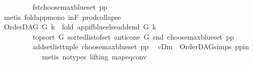 \begin{isabellebody}
\ \ \ \ \ \ \ \ \ {\isacharparenleft}{\kern0pt}fst{\isacharparenleft}{\kern0pt}{\isacharparenleft}{\kern0pt}choose{\isacharunderscore}{\kern0pt}max{\isacharunderscore}{\kern0pt}blue{\isacharunderscore}{\kern0pt}set\ pp{\isacharparenright}{\kern0pt}{\isacharparenright}{\kern0pt}{\isacharparenright}{\kern0pt}{\isacharparenright}{\kern0pt}{\isacharparenright}{\kern0pt}{\isachardoublequoteclose}\isanewline
\ \ \ \ \ \ \ \ \ \ \isamarkupfalse%
\ {\isacharparenleft}{\kern0pt}metis\ fold{\isacharunderscore}{\kern0pt}app{\isacharunderscore}{\kern0pt}mono{}\ in{\isacharunderscore}{\kern0pt}F\ prod{\isachardot}{\kern0pt}collapse{\isacharparenright}{\kern0pt}\ \isanewline
\ \ \ \ \ \ \ \ \isamarkupfalse%
\ \isamarkupfalse%
\ {\isachardoublequoteopen}OrderDAG\ G\ k\ {\isacharequal}{\kern0pt}\ {\isacharparenleft}{\kern0pt}fold\ {\isacharparenleft}{\kern0pt}app{\isacharunderscore}{\kern0pt}if{\isacharunderscore}{\kern0pt}blue{\isacharunderscore}{\kern0pt}else{\isacharunderscore}{\kern0pt}add{\isacharunderscore}{\kern0pt}end\ G\ k{\isacharparenright}{\kern0pt}\isanewline
\ \ \ \ \ \ \ \ \ {\isacharparenleft}{\kern0pt}top{\isacharunderscore}{\kern0pt}sort\ G\ {\isacharparenleft}{\kern0pt}sorted{\isacharunderscore}{\kern0pt}list{\isacharunderscore}{\kern0pt}of{\isacharunderscore}{\kern0pt}set\ {\isacharparenleft}{\kern0pt}anticone\ G\ {\isacharparenleft}{\kern0pt}snd\ {\isacharparenleft}{\kern0pt}choose{\isacharunderscore}{\kern0pt}max{\isacharunderscore}{\kern0pt}blue{\isacharunderscore}{\kern0pt}set\ pp{\isacharparenright}{\kern0pt}{\isacharparenright}{\kern0pt}{\isacharparenright}{\kern0pt}{\isacharparenright}{\kern0pt}{\isacharparenright}{\kern0pt}\isanewline
\ \ \ \ \ \ \ \ \ {\isacharparenleft}{\kern0pt}add{\isacharunderscore}{\kern0pt}set{\isacharunderscore}{\kern0pt}list{\isacharunderscore}{\kern0pt}tuple\ {\isacharparenleft}{\kern0pt}choose{\isacharunderscore}{\kern0pt}max{\isacharunderscore}{\kern0pt}blue{\isacharunderscore}{\kern0pt}set\ pp{\isacharparenright}{\kern0pt}{\isacharparenright}{\kern0pt}{\isacharparenright}{\kern0pt}{\isachardoublequoteclose}\ \isamarkupfalse%
\ cDm\ {}\ OrderDAG{\isachardot}{\kern0pt}simps\ pp{\isacharunderscore}{\kern0pt}in\isanewline
\ \ \ \ \ \ \ \ \ \ \isamarkupfalse%
\ {\isacharparenleft}{\kern0pt}metis\ {\isacharparenleft}{\kern0pt}no{\isacharunderscore}{\kern0pt}types{\isacharcomma}{\kern0pt}\ lifting{\isacharparenright}{\kern0pt}\ map{\isacharunderscore}{\kern0pt}eq{\isacharunderscore}{\kern0pt}conv{\isacharparenright}{\kern0pt}\ \isanewline

\end{isabellebody}
